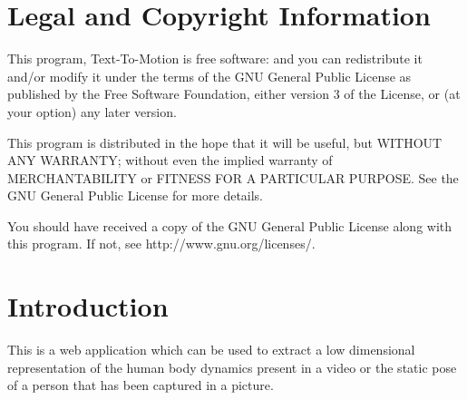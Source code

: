 \documentclass{scrreprt}
\begin{document}
\newcommand{\requirement}[9]{%
\fbox{\parbox{\textwidth}{%
\parbox[t]{.333\textwidth}{\raggedright%
\textbf{Req. \#}: \refstepcounter{RequirementNumber} \arabic{RequirementNumber} \label{#1}}%
\parbox[t]{.333\textwidth}{\centering%
\textbf{Req. Type}: #2}%
\parbox[t]{.333\textwidth}{\raggedleft%
\textbf{Use Case \#}: \ref{#3}}
\newline\\
\textbf{Description}: #4\\\\
\textbf{Rationale}: #5\\\\
\textbf{Originator}: #6\\\\
\textbf{Fit Criterion}: #7\\\\
\textbf{Priority}: #8 \hfill \textbf{History}: #9\\\\
}}}

\section{Legal and Copyright Information}

This program, Text-To-Motion is free software: and you can redistribute it and/or modify
    it under the terms of the GNU General Public License as published by
    the Free Software Foundation, either version 3 of the License, or
    (at your option) any later version.

    This program is distributed in the hope that it will be useful,
    but WITHOUT ANY WARRANTY; without even the implied warranty of
    MERCHANTABILITY or FITNESS FOR A PARTICULAR PURPOSE.  See the
    GNU General Public License for more details.

    You should have received a copy of the GNU General Public License
    along with this program.  If not, see http://www.gnu.org/licenses/.


\section{Introduction}
This is a web application which can be used to extract a low dimensional representation of the human body dynamics present in a video or the static pose of a person that has been captured in a picture.
\end{document}
